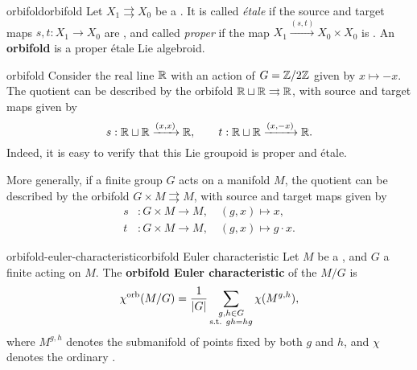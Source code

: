 \begin{topic}{orbifold}{orbifold}
    Let $X_1 \rightrightarrows X_0$ be a . It is called \textit{étale} if the source and target maps $s, t : X_1 \to X_0$ are , and called \textit{proper} if the map $X_1 \xrightarrow{(s, t)} X_0 \times X_0$ is . An \textbf{orbifold} is a proper étale Lie algebroid.
\end{topic}

\begin{example}{orbifold}
    Consider the real line $\mathbb{R}$ with an action of $G = \mathbb{Z}/2\mathbb{Z}$ given by $x \mapsto -x$. The quotient can be described by the orbifold $\mathbb{R} \sqcup \mathbb{R} \rightrightarrows \mathbb{R}$, with source and target maps given by
    \[ s : \mathbb{R} \sqcup \mathbb{R} \xrightarrow{(x, x)} \mathbb{R}, \qquad t  : \mathbb{R} \sqcup \mathbb{R} \xrightarrow{(x, -x)} \mathbb{R} . \]
    Indeed, it is easy to verify that this Lie groupoid is proper and étale.
    
    More generally, if a finite group $G$ acts on a manifold $M$, the quotient can be described by the orbifold $G \times M \rightrightarrows M$, with source and target maps given by
    \[ \begin{aligned}
        s &: G \times M \to M, \quad (g, x) \mapsto x , \\
        t &: G \times M \to M, \quad (g, x) \mapsto g \cdot x .
    \end{aligned} \]
\end{example}

\begin{topic}{orbifold-euler-characteristic}{orbifold Euler characteristic}
    Let $M$ be a  , and $G$ a finite  acting on $M$. The \textbf{orbifold Euler characteristic} of the  $M/G$ is
    \[ \chi^\textup{orb}(M/G) = \frac{1}{|G|} \sum_{\substack{g, h \in G \\ \textup{s.t. } gh = hg}} \chi(M^{g, h}) , \]
    where $M^{g, h}$ denotes the submanifold of points fixed by both $g$ and $h$, and $\chi$ denotes the ordinary .
\end{topic}

